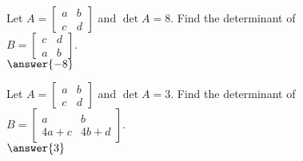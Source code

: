 \documentclass{ximera}
\begin{document}
      \begin{question} Let $A = \begin{bmatrix} a & b\\ c&d\end{bmatrix}$ and $\det A = 8$. Find the determinant of \\ $B = \begin{bmatrix} c & d\\ a&b\end{bmatrix}$.\\
      	
      $	\answer{-8}$
      	
      \end{question}	
            \begin{question} Let $A = \begin{bmatrix} a & b\\ c&d\end{bmatrix}$ and $\det A = 3$. Find the determinant of \\ $B = \begin{bmatrix} a & b\\ 4a+c&4b+d\end{bmatrix}$.\\
            	
            $	\answer{3}$
            	
            \end{question}	
  
\end{document}
